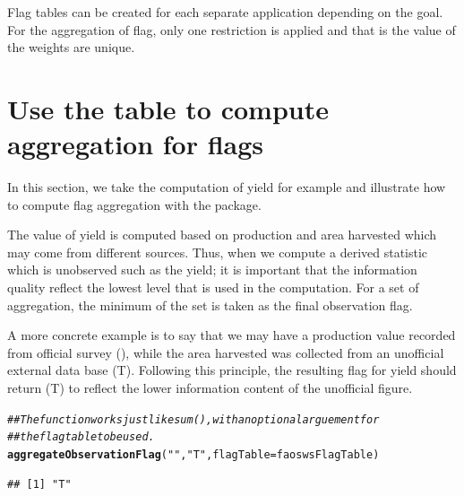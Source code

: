 \documentclass[nojss]{jss}\usepackage[]{graphicx}\usepackage[]{color}
\makeatletter
\newcommand{\hlstr}[1]{\textcolor[rgb]{0.192,0.494,0.8}{#1}}%
\newcommand{\hlcom}[1]{\textcolor[rgb]{0.678,0.584,0.686}{\textit{#1}}}%
\newcommand{\hlstd}[1]{\textcolor[rgb]{0.345,0.345,0.345}{#1}}%
\newcommand{\hlkwc}[1]{\textcolor[rgb]{0.333,0.667,0.333}{#1}}%
\newcommand{\hlkwd}[1]{\textcolor[rgb]{0.737,0.353,0.396}{\textbf{#1}}}%
\newenvironment{kframe}{%
 \def\at@end@of@kframe{}%
 \ifinner\ifhmode%
  \def\at@end@of@kframe{\end{minipage}}%
  \begin{minipage}{\columnwidth}%
 \fi\fi%
 \def\FrameCommand##1{\hskip\@totalleftmargin \hskip-\fboxsep
 \colorbox{shadecolor}{##1}\hskip-\fboxsep
     \hskip-\linewidth \hskip-\@totalleftmargin \hskip\columnwidth}%
 \MakeFramed {\advance\hsize-\width
   \@totalleftmargin\z@ \linewidth\hsize
   \@setminipage}}%
 {\par\unskip\endMakeFramed%
 \at@end@of@kframe}
\newenvironment{knitrout}{}{} %
\makeatother
\begin{document}
Flag tables can be created for each separate application depending on
the goal. For the aggregation of flag, only one restriction is applied
and that is the value of the weights are unique.


\section{Use the table to compute aggregation for flags}

In this section, we take the computation of yield for example and
illustrate how to compute flag aggregation with the package. 

The value of yield is computed based on production and area harvested
which may come from different sources. Thus, when we compute a derived
statistic which is unobserved such as the yield; it is important that
the information quality reflect the lowest level that is used in the
computation. For a set of aggregation, the minimum of the set is taken
as the final observation flag.

A more concrete example is to say that we may have a production value
recorded from official survey (), while the area harvested was
collected from an unofficial external data base (T). Following this
principle, the resulting flag for yield should return (T) to reflect
the lower information content of the unofficial figure.


\begin{knitrout}
\color{fgcolor}\begin{kframe}
\begin{alltt}
\hlcom{## The function works just like sum(), with an optional arguement for}
\hlcom{## the flag table to be used.}
\hlkwd{aggregateObservationFlag}\hlstd{(}\hlstr{""}\hlstd{,} \hlstr{"T"}\hlstd{,} \hlkwc{flagTable} \hlstd{= faoswsFlagTable)}
\end{alltt}
\begin{verbatim}
## [1] "T"
\end{verbatim}
\end{kframe}
\end{knitrout}
\end{document}
